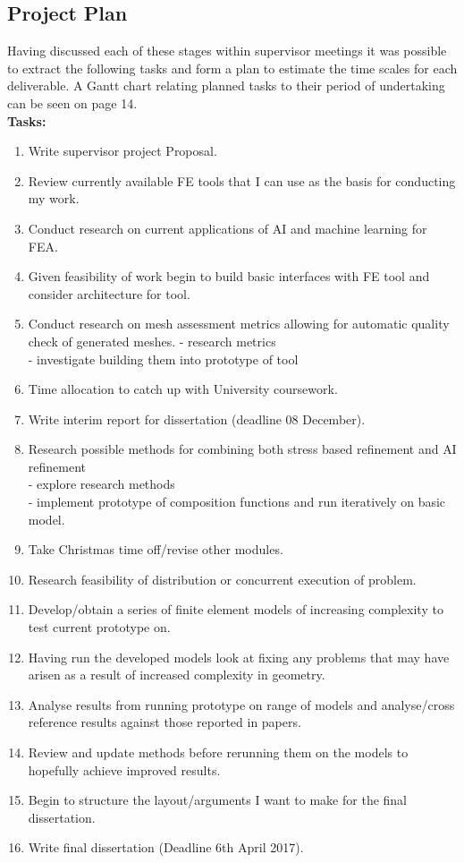\documentclass{article}
\begin{document}
\subsection{Project Plan}
\noindent
Having discussed each of these stages within supervisor meetings it was possible to extract the following tasks and form a plan to estimate the time scales for each deliverable. A Gantt chart relating planned tasks to their period of undertaking can be seen on page 14.\\ 


\noindent
\textbf{Tasks:}

\begin{enumerate}[label=\Alph*]
\item Write supervisor project Proposal.
\item Review currently available FE tools that I can use as the basis for conducting my work.
\item Conduct research on current applications of AI and machine learning for FEA.
\item Given feasibility of work begin to build basic interfaces with FE tool and consider architecture for tool.
\item Conduct research on mesh assessment metrics allowing for automatic quality check of generated meshes.
- research metrics\\
- investigate building them into prototype of tool
\item Time allocation to catch up with University coursework.
\item Write interim report for dissertation (deadline 08 December).
\item Research possible methods for combining both stress based refinement and AI refinement\\
- explore research methods\\
- implement prototype of composition functions and run iteratively on basic model.
\item Take Christmas time off/revise other modules.
\item Research feasibility of distribution or concurrent execution of problem.
\item Develop/obtain a series of finite element models of increasing complexity to test current prototype on.
\item Having run the developed models look at fixing any problems that may have arisen as a result of increased complexity in geometry.
\item Analyse results from running prototype on range of models and analyse/cross reference results against those reported in papers.
\item Review and update methods before rerunning  them on the models to hopefully achieve improved results.
\item Begin to structure the layout/arguments I want to make for the final dissertation.
\item Write final dissertation (Deadline 6th April 2017).
\end{enumerate}
\end{document}
